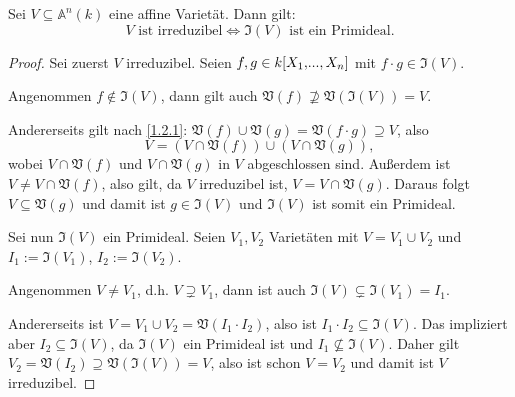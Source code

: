 \documentclass[a4paper,12pt]{scrbook}
\theoremstyle{keinenummern} %
\theoremstyle{mitnummern}
\theoremstyle{unserbeweis}
\newtheorem{proof}{Beweis}
\def\A{\mathbb{A}}
\def\V{\mathfrak{V}}
\def\I{\mathfrak{I}}
\renewcommand{\dotsc}{\ensuremath{\!...}}
\newcommand{\polyx}[1][n]{\ensuremath%
  [X_{1},\dotsc,X_{#1}]}
\begin{document}
\begin{bem}\label{1.2.9}
Sei $V\subseteq\A^{n}(k)$ eine affine Varietät. Dann gilt:
\[V\text{ ist irreduzibel}\iff\I(V)\text{ ist ein Primideal}.\]
\end{bem}
\begin{proof}
Sei zuerst $V$ irreduzibel. Seien $f,g\in k\polyx$ mit $f\cdot g\in\I(V)$. 

Angenommen $f\notin\I(V)$, dann gilt auch $\V(f)\not\supseteq\V(\I(V))=V$.

Andererseits gilt nach \cref{1.2.1}: $\V(f)\cup\V(g)=\V(f\cdot g)\supseteq V$, also
\[V=(V\cap \V(f))\cup(V\cap\V(g)),\]
wobei $V\cap\V(f)$ und $V\cap\V(g)$ in $V$ abgeschlossen sind. Außerdem ist $V\neq V\cap\V(f)$, also gilt, da $V$ irreduzibel ist, $V=V\cap\V(g)$. Daraus folgt $V\subseteq\V(g)$ und damit ist $g\in\I(V)$ und $\I(V)$ ist somit ein Primideal.

Sei nun $\I(V)$ ein Primideal. Seien $V_{1},V_{2}$ Varietäten mit $V=V_{1}\cup V_{2}$ und $I_{1}:=\I(V_{1})$, $I_{2}:=\I(V_{2})$.

Angenommen $V\neq V_{1}$, d.h. $V\supsetneq V_{1}$, dann ist auch $\I(V)\subsetneq\I(V_{1})=I_{1}$.

Andererseits ist $V=V_{1}\cup V_{2}=\V(I_{1}\cdot I_{2})$, also ist $I_{1}\cdot I_{2}\subseteq\I(V)$. Das impliziert aber $I_{2}\subseteq\I(V)$, da $\I(V)$ ein Primideal ist und $I_{1}\not\subseteq\I(V)$. Daher gilt $V_{2}=\V(I_{2})\supseteq\V(\I(V))=V$, also ist schon $V=V_{2}$ und damit ist $V$ irreduzibel.
\end{proof}
\end{document}
